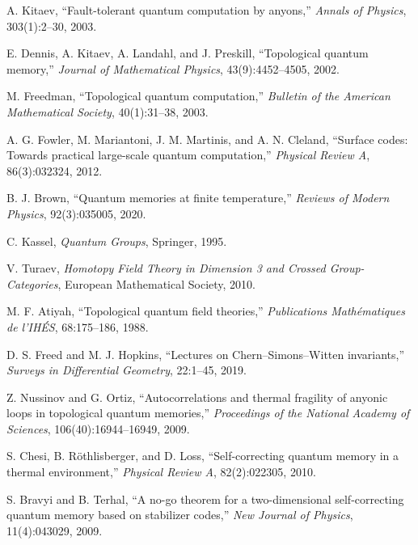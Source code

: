 \documentclass[12pt]{article}
\begin{document}

\begin{thebibliography}{99}

A. Kitaev,
\newblock ``Fault-tolerant quantum computation by anyons,''
\newblock \emph{Annals of Physics}, 303(1):2--30, 2003.

E. Dennis, A. Kitaev, A. Landahl, and J. Preskill,
\newblock ``Topological quantum memory,''
\newblock \emph{Journal of Mathematical Physics}, 43(9):4452--4505, 2002.

M. Freedman,
\newblock ``Topological quantum computation,''
\newblock \emph{Bulletin of the American Mathematical Society}, 40(1):31--38, 2003.

A. G. Fowler, M. Mariantoni, J. M. Martinis, and A. N. Cleland,
\newblock ``Surface codes: Towards practical large-scale quantum computation,''
\newblock \emph{Physical Review A}, 86(3):032324, 2012.

B. J. Brown,
\newblock ``Quantum memories at finite temperature,''
\newblock \emph{Reviews of Modern Physics}, 92(3):035005, 2020.

C. Kassel,
\newblock \emph{Quantum Groups},
\newblock Springer, 1995.

V. Turaev,
\newblock \emph{Homotopy Field Theory in Dimension 3 and Crossed Group-Categories},
\newblock European Mathematical Society, 2010.

M. F. Atiyah,
\newblock ``Topological quantum field theories,''
\newblock \emph{Publications Math\'ematiques de l'IH\'ES}, 68:175--186, 1988.

D. S. Freed and M. J. Hopkins,
\newblock ``Lectures on Chern--Simons--Witten invariants,''
\newblock \emph{Surveys in Differential Geometry}, 22:1--45, 2019.

Z. Nussinov and G. Ortiz,
\newblock ``Autocorrelations and thermal fragility of anyonic loops in topological quantum memories,''
\newblock \emph{Proceedings of the National Academy of Sciences}, 106(40):16944--16949, 2009.

S. Chesi, B. R\"othlisberger, and D. Loss,
\newblock ``Self-correcting quantum memory in a thermal environment,''
\newblock \emph{Physical Review A}, 82(2):022305, 2010.

S. Bravyi and B. Terhal,
\newblock ``A no-go theorem for a two-dimensional self-correcting quantum memory based on stabilizer codes,''
\newblock \emph{New Journal of Physics}, 11(4):043029, 2009.


\end{thebibliography}
\end{document}

